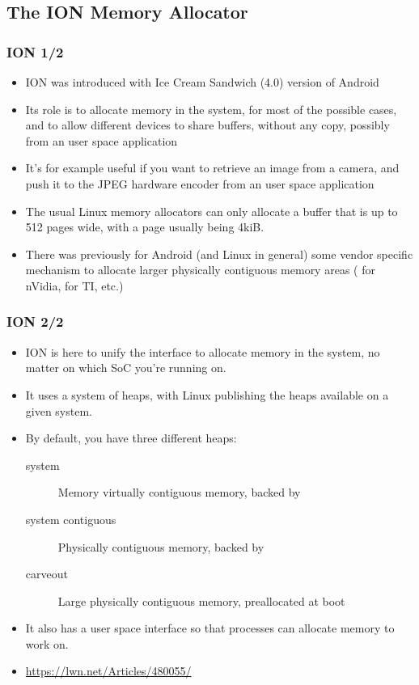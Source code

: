 \subsection{The ION Memory Allocator}
\begin{frame}
  \frametitle{ION 1/2}
  \begin{itemize}
  \item ION was introduced with Ice Cream Sandwich (4.0) version of
    Android
  \item Its role is to allocate memory in the system, for most of the
    possible cases, and to allow different devices to share buffers,
    without any copy, possibly from an user space application
  \item It's for example useful if you want to retrieve an image from
    a camera, and push it to the JPEG hardware encoder from an
    user space application
  \item The usual Linux memory allocators can only allocate a buffer
    that is up to 512 pages wide, with a page usually being 4kiB.
  \item There was previously for Android (and Linux in general) some
    vendor specific mechanism to allocate larger physically contiguous
    memory areas ( for nVidia,  for TI, etc.)
  \end{itemize}
\end{frame}

\begin{frame}
  \frametitle{ION 2/2}
  \begin{itemize}
  \item ION is here to unify the interface to allocate memory in the
    system, no matter on which SoC you're running on.
  \item It uses a system of heaps, with Linux publishing the heaps
    available on a given system.
  \item By default, you have three different heaps:
    \begin{description}
    \item[system] Memory virtually contiguous memory, backed by
    \item[system contiguous] Physically contiguous memory, backed by
    \item[carveout] Large physically contiguous memory, preallocated
      at boot
    \end{description}
  \item It also has a user space interface so that processes can
    allocate memory to work on.
  \item \url{https://lwn.net/Articles/480055/}
  \end{itemize}
\end{frame}

